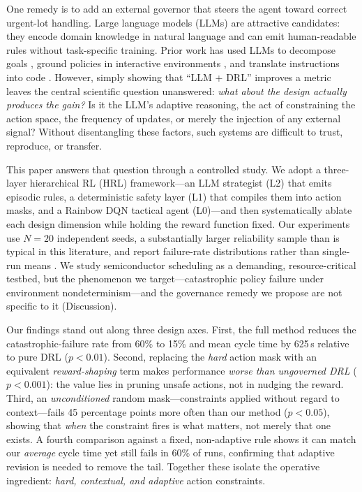 \documentclass[letterpaper]{article} %
\begin{document}
One remedy is to add an external governor that steers the agent toward
correct urgent-lot handling. Large language models (LLMs) are attractive
candidates: they encode domain knowledge in natural language and can emit
human-readable rules without task-specific training. Prior work has used LLMs to
decompose goals \citep{du2023}, ground policies in interactive environments
\citep{carta2023}, and translate instructions into code \citep{liang2023}.
However, simply showing that ``LLM + DRL'' improves a metric leaves the central
scientific question unanswered: \emph{what about the design actually produces the
gain?} Is it the LLM's adaptive reasoning, the act of constraining the action
space, the frequency of updates, or merely the injection of any external signal?
Without disentangling these factors, such systems are difficult to trust,
reproduce, or transfer.

This paper answers that question through a controlled study. We adopt a
three-layer hierarchical RL (HRL) framework---an LLM strategist (L2) that emits
episodic rules, a deterministic safety layer (L1) that compiles them into action
masks, and a Rainbow DQN tactical agent (L0)---and then systematically ablate
each design dimension while holding the reward function fixed. Our experiments
use $N{=}20$ independent seeds, a substantially larger reliability sample than is
typical in this literature, and report failure-rate distributions rather than
single-run means \citep{henderson2018,agarwal2021}. We study semiconductor
scheduling as a demanding, resource-critical testbed, but the phenomenon we
target---catastrophic policy failure under environment nondeterminism---and the
governance remedy we propose are not specific to it (Discussion).

Our findings stand out along three design axes. First, the full method reduces
the catastrophic-failure rate from 60\% to 15\% and mean cycle time by 625\,s
relative to pure DRL ($p{<}0.01$). Second, replacing the \emph{hard} action mask
with an equivalent \emph{reward-shaping} term makes performance \emph{worse than
ungoverned DRL} ($p{<}0.001$): the value lies in pruning unsafe actions, not in
nudging the reward. Third, an \emph{unconditioned} random mask---constraints
applied without regard to context---fails 45 percentage points more often than
our method ($p{<}0.05$), showing that \emph{when} the constraint fires is what
matters, not merely that one exists. A fourth comparison against a fixed,
non-adaptive rule shows it can match our \emph{average} cycle time yet still
fails in 60\% of runs, confirming that adaptive revision is needed to remove the
tail. Together these isolate the operative ingredient: \emph{hard, contextual,
and adaptive} action constraints.
\end{document}
